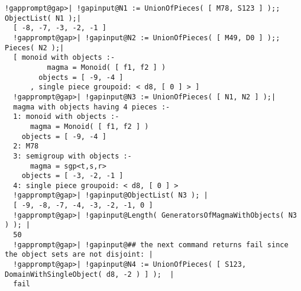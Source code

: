 \documentclass[a4paper,11pt]{report}
\begin{document}
{{\begin{Verbatim}[commandchars=!@|,fontsize=\small,frame=single,label=Example]
  !gapprompt@gap>| !gapinput@N1 := UnionOfPieces( [ M78, S123 ] );;  ObjectList( N1 );|
  [ -8, -7, -3, -2, -1 ]
  !gapprompt@gap>| !gapinput@N2 := UnionOfPieces( [ M49, D0 ] );;  Pieces( N2 );|
  [ monoid with objects :-
          magma = Monoid( [ f1, f2 ] )
        objects = [ -9, -4 ]
      , single piece groupoid: < d8, [ 0 ] > ]
  !gapprompt@gap>| !gapinput@N3 := UnionOfPieces( [ N1, N2 ] );|
  magma with objects having 4 pieces :-
  1: monoid with objects :-
      magma = Monoid( [ f1, f2 ] )
    objects = [ -9, -4 ]
  2: M78
  3: semigroup with objects :-
      magma = sgp<t,s,r>
    objects = [ -3, -2, -1 ]
  4: single piece groupoid: < d8, [ 0 ] >
  !gapprompt@gap>| !gapinput@ObjectList( N3 ); |
  [ -9, -8, -7, -4, -3, -2, -1, 0 ]
  !gapprompt@gap>| !gapinput@Length( GeneratorsOfMagmaWithObjects( N3 ) ); |
  50
  !gapprompt@gap>| !gapinput@## the next command returns fail since the object sets are not disjoint: |
  !gapprompt@gap>| !gapinput@N4 := UnionOfPieces( [ S123, DomainWithSingleObject( d8, -2 ) ] );  |
  fail
  
\end{Verbatim}
 }

 }

          
\end{document}
